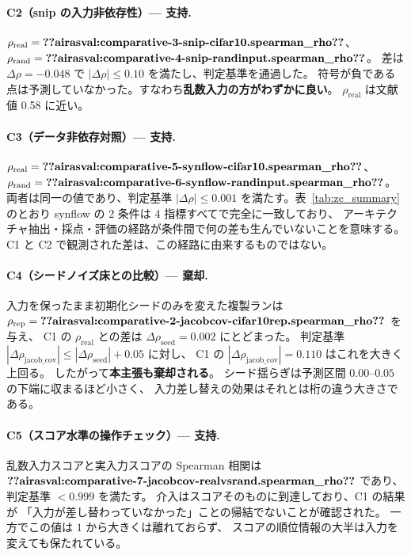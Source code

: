 \documentclass[11pt]{article}
\providecommand{\airasval}[1]{\textbf{??airasval:\detokenize{#1}??}}
\providecommand{\unverified}[1]{#1}
\begin{document}
\paragraph{C2（snip の入力非依存性）— 支持.}
$\rho_{\mathrm{real}} = \airasval{comparative-3-snip-cifar10.spearman_rho}$、
$\rho_{\mathrm{rand}} = \airasval{comparative-4-snip-randinput.spearman_rho}$。
差は $\Delta\rho = \unverified{-0.048}$ で $|\Delta\rho| \le 0.10$ を満たし、判定基準を通過した。
符号が負である点は予測していなかった。すなわち\textbf{乱数入力の方がわずかに良い}。
$\rho_{\mathrm{real}}$ は文献値 \unverified{0.58} に近い。

\paragraph{C3（データ非依存対照）— 支持.}
$\rho_{\mathrm{real}} = \airasval{comparative-5-synflow-cifar10.spearman_rho}$、
$\rho_{\mathrm{rand}} = \airasval{comparative-6-synflow-randinput.spearman_rho}$。
両者は同一の値であり、判定基準 $|\Delta\rho| \le 0.001$ を満たす。表~\ref{tab:zc_summary} のとおり
synflow の 2 条件は 4 指標すべてで完全に一致しており、
アーキテクチャ抽出・採点・評価の経路が条件間で何の差も生んでいないことを意味する。
C1 と C2 で観測された差は、この経路に由来するものではない。

\paragraph{C4（シードノイズ床との比較）— \textbf{棄却}.}
入力を保ったまま初期化シードのみを変えた複製ランは
$\rho_{\mathrm{rep}} = \airasval{comparative-2-jacobcov-cifar10rep.spearman_rho}$ を与え、
C1 の $\rho_{\mathrm{real}}$ との差は $\Delta\rho_{\mathrm{seed}} = \unverified{0.002}$ にとどまった。
判定基準 $|\Delta\rho_{\mathrm{jacob\_cov}}| \le |\Delta\rho_{\mathrm{seed}}| + 0.05$ に対し、
C1 の $|\Delta\rho_{\mathrm{jacob\_cov}}| = \unverified{0.110}$ はこれを大きく上回る。
したがって\textbf{本主張も棄却される}。
シード揺らぎは予測区間 $0.00$--$0.05$ の下端に収まるほど小さく、
入力差し替えの効果はそれとは桁の違う大きさである。

\paragraph{C5（スコア水準の操作チェック）— 支持.}
乱数入力スコアと実入力スコアの Spearman 相関は
$\airasval{comparative-7-jacobcov-realvsrand.spearman_rho}$ であり、判定基準 $<0.999$ を満たす。
介入はスコアそのものに到達しており、C1 の結果が
「入力が差し替わっていなかった」ことの帰結でないことが確認された。
一方でこの値は $1$ から大きくは離れておらず、
スコアの順位情報の大半は入力を変えても保たれている。
\end{document}
